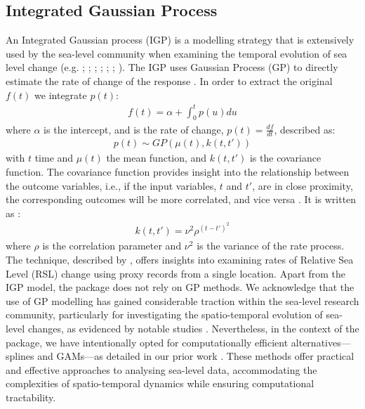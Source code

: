 \subsection{Integrated Gaussian Process}\label{integratedgaussianprocess}
An Integrated Gaussian process (IGP) is a modelling strategy that is extensively used by the sea-level community when examining the temporal evolution of sea level change (e.g. \citet{Cahill2015aStats}; \citet{Hawkes2016}; \citet{Kemp2017}; \citet{Shaw2018}; \citet{Dean2019}; \citet{Stearns2023}; \citet{Kirby2023}).
The IGP uses Gaussian Process (GP) to directly estimate the rate of change of the response \citep{Holsclaw2013}. In order to extract the original \(f(t)\) we integrate \(p(t)\):
\begin{align}
    f(t) = \alpha + \int^t_0p(u)du
\end{align}
where \(\alpha\) is the intercept, and is the rate of change, \(p(t) = \frac{df}{dt}\), described as:
\begin{align}
    p(t) \sim GP(\mu(t),k(t,t'))
\end{align}
with \(t\) time and \(\mu(t)\) the mean function, and \(k(t,t')\) is the covariance function. The covariance function provides insight into the relationship between the outcome variables, i.e., if the input variables, \(t\) and \(t'\), are in close proximity, the corresponding outcomes will be more correlated, and vice versa \citep{Rasmussen2006}. It is written as \citep{Cahill2015aStats}:
\begin{align} 
    k(t,t') = \nu^2\rho^{(t-t')^2}
\end{align}
where \(\rho\) is the correlation parameter and \(\nu^2\) is the variance of the rate process.
The technique, described by \citet{Cahill2015aStats}, offers insights into examining rates of Relative Sea Level (RSL) change using proxy records from a single location. Apart from the IGP model, the  package does not rely on GP methods. We acknowledge that the use of GP modelling has gained considerable traction within the sea-level research community, particularly for investigating the spatio-temporal evolution of sea-level changes, as evidenced by notable studies \citep{Kopp2009, Kopp2013, Kopp2016, Kemp2018, Walker2021}. Nevertheless, in the context of the  package, we have intentionally opted for computationally efficient alternatives---splines and GAMs---as detailed in our prior work \citep{Upton2023noisy}. These methods offer practical and effective approaches to analysing sea-level data, accommodating the complexities of spatio-temporal dynamics while ensuring computational tractability.

